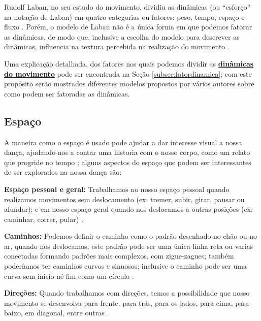 Rudolf Laban, no seu estudo do movimento, 
dividiu as dinâmicas (ou ``esforço'' na notação de Laban) 
em quatro categorias ou fatores: peso, tempo, espaço e fluxo 
\cite[pp. 5]{carline2011lesson}
\cite[pp. 30]{paine2014complete}.
Porém, o modelo de Laban não é a única forma em que podemos fatorar as dinâmicas,
de modo que, inclusive a escolha do modelo para descrever as dinâmicas,
influencia na textura percebida na realização do movimento \cite[pp. 30]{paine2014complete}. 

Uma explicação detalhada, dos fatores nos quais podemos dividir as 
\hyperref[subsec:fatordinamica]{\textbf{dinâmicas do movimento}} 
pode ser encontrada na Seção \ref{subsec:fatordinamica};
com este propósito serão mostrados diferentes modelos propostos por vários autores 
sobre como podem ser fatoradas as dinâmicas.



\subsection{Espaço} 
A maneira como o espaço é usado pode ajudar a dar interesse visual a nossa dança,
ajudando-nos a contar uma historia com o nosso corpo, como um relato que progride no tempo 
\cite[pp. 6]{carline2011lesson}
\cite[pp. 31]{paine2014complete}
\cite[pp. 131, 136]{mccutchen2006teaching}; 
alguns aspectos do espaço que podem ser interessantes de ser explorados na nossa dança são:

\textbf{Espaço pessoal e geral:}  Trabalhamos no nosso espaço pessoal 
quando realizamos movimentos sem deslocamento 
(ex: tremer, subir, girar, pausar ou afundar);
e em nosso espaço geral quando nos deslocamos a outras posições
(ex: caminhar, correr, pular) \cite[pp. 7]{carline2011lesson}
\cite[pp. 32]{paine2014complete}.

\textbf{Caminhos:} Podemos definir o caminho como o padrão desenhado no chão ou no ar, 
quando nos deslocamos,
este padrão pode ser uma única linha reta ou 
varias conectadas formando padrões mais complexos, 
 com zigue-zagues; também poderíamos ter caminhos curvos e sinuosos; 
inclusive o caminho pode ser uma curva sem inicio né fim como um círculo 
\cite[pp. 7]{carline2011lesson}
\cite[pp. 32]{paine2014complete}.



\textbf{Direções:} Quando trabalhamos com direções, 
temos a possibilidade que nosso movimento se desenvolva 
para frente, para trás, para os lados, para cima, para baixo, em diagonal,
entre outras 
\cite[pp. 7]{carline2011lesson}
\cite[pp. 32]{paine2014complete}
\cite[pp. 97-98]{schrader2005sense}. 


